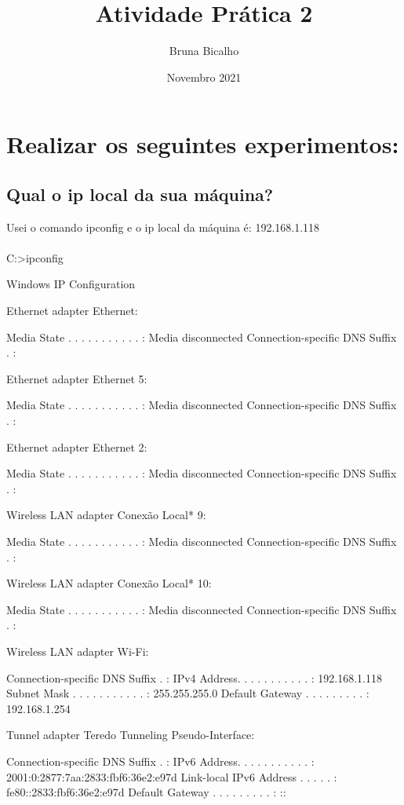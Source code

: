 \documentclass{article}
\title{Atividade Prática 2}
\author{Bruna Bicalho }
\date{Novembro 2021}
\begin{document}
\maketitle

\section{Realizar os seguintes experimentos:}

\subsection{Qual o ip local da sua máquina?}

Usei o comando ipconfig e o  ip local da máquina é: 192.168.1.118
\paragraph{}

C:\Users{}>ipconfig

Windows IP Configuration


Ethernet adapter Ethernet:

   Media State . . . . . . . . . . . : Media disconnected
   Connection-specific DNS Suffix  . :

Ethernet adapter Ethernet 5:

   Media State . . . . . . . . . . . : Media disconnected
   Connection-specific DNS Suffix  . :

Ethernet adapter Ethernet 2:

   Media State . . . . . . . . . . . : Media disconnected
   Connection-specific DNS Suffix  . :

Wireless LAN adapter Conexão Local* 9:

   Media State . . . . . . . . . . . : Media disconnected
   Connection-specific DNS Suffix  . :

Wireless LAN adapter Conexão Local* 10:

   Media State . . . . . . . . . . . : Media disconnected
   Connection-specific DNS Suffix  . :

Wireless LAN adapter Wi-Fi:

   Connection-specific DNS Suffix  . :
   IPv4 Address. . . . . . . . . . . : 192.168.1.118
   Subnet Mask . . . . . . . . . . . : 255.255.255.0
   Default Gateway . . . . . . . . . : 192.168.1.254

Tunnel adapter Teredo Tunneling Pseudo-Interface:

   Connection-specific DNS Suffix  . :
   IPv6 Address. . . . . . . . . . . : 2001:0:2877:7aa:2833:fbf6:36e2:e97d
   Link-local IPv6 Address . . . . . : fe80::2833:fbf6:36e2:e97d%
   Default Gateway . . . . . . . . . : ::
\end{document}
